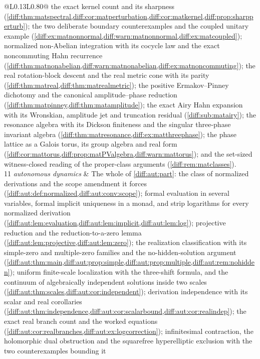 \documentclass[11pt,letterpaper]{article}
\numberwithin{equation}{section}
\theoremstyle{definition}
\theoremstyle{remark}
\begin{document}
\begin{longtable}{@{}L{0.13\textwidth}L{0.80\textwidth}@{}}
the exact kernel count and its sharpness
(\cref{diff:thm:matspectral,diff:cor:matperturbation,diff:cor:matkernel,diff:prop:sharpperturb});
the two deliberate boundary counterexamples and the coupled unitary example
(\cref{diff:ex:matnonnormal,diff:warn:matnonnormal,diff:ex:matcoupled});
normalized non-Abelian integration with its cocycle law and the exact
noncommuting Hahn recurrence
(\cref{diff:thm:matnonabelian,diff:warn:matnonabelian,diff:ex:matnoncommuting});
the real rotation-block descent and the real metric cone with its parity
(\cref{diff:thm:matreal,diff:thm:matrealmetric}); the positive
Ermakov--Pinney dichotomy and the canonical amplitude--phase reduction
(\cref{diff:thm:matpinney,diff:thm:matamplitude}); the exact Airy Hahn
expansion with its Wronskian, amplitude jet and truncation residual
(\cref{diff:sub:matairy}); the resonance algebra with its Dickson finiteness
and the singular three-phase invariant algebra
(\cref{diff:thm:matresonance,diff:ex:matthreephase}); the phase lattice as a
Galois torus, its group algebra and real form
(\cref{diff:cor:mattorus,diff:prop:matPValgebra,diff:warn:mattorus}); and the
set-sized witness-closed reading of the proper-class arguments
(\cref{diff:rem:matclasses}). \\[0.3em]
11 \newline\emph{autonomous dynamics} &
The whole of \cref{diff:aut:part}: the class of normalized derivations and the
scope amendment it forces (\cref{diff:aut:def:normalized,diff:aut:conv:scope});
formal evaluation in several variables, formal implicit uniqueness in a monad,
and strip logarithms for every normalized derivation
(\cref{diff:aut:lem:evaluation,diff:aut:lem:implicit,diff:aut:lem:log});
projective reduction and the reduction-to-a-zero lemma
(\cref{diff:aut:lem:projective,diff:aut:lem:zero}); the realization
classification with its simple-zero and multiple-zero families and the
no-hidden-solution argument
(\cref{diff:aut:thm:main,diff:aut:prop:simple,diff:aut:prop:multiple,diff:aut:rem:nohidden});
uniform finite-scale localization with the three-shift formula, and the
continuum of algebraically independent solutions inside two scales
(\cref{diff:aut:thm:scales,diff:aut:cor:independent}); derivation independence
with its scalar and real corollaries
(\cref{diff:aut:thm:independence,diff:aut:cor:scalarbound,diff:aut:cor:realindep});
the exact real branch count and the worked equations
(\cref{diff:aut:cor:realbranches,diff:aut:ex:logcorrection}); infinitesimal
contraction, the holomorphic dual obstruction and the squarefree hyperelliptic
exclusion with the two counterexamples bounding it

\end{longtable}
\end{document}
